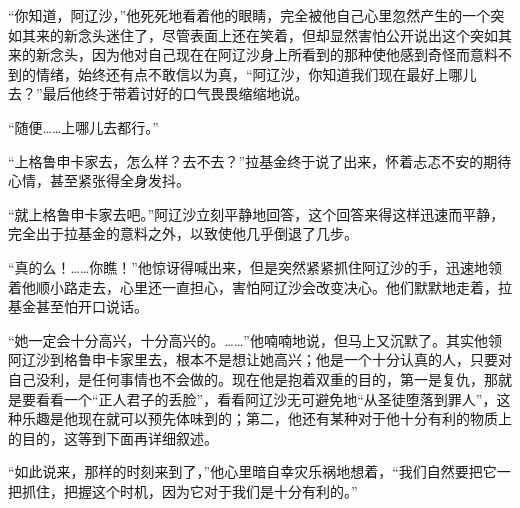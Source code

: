 \par “你知道，阿辽沙，”他死死地看着他的眼睛，完全被他自己心里忽然产生的一个突如其来的新念头迷住了，尽管表面上还在笑着，但却显然害怕公开说出这个突如其来的新念头，因为他对自己现在在阿辽沙身上所看到的那种使他感到奇怪而意料不到的情绪，始终还有点不敢信以为真，“阿辽沙，你知道我们现在最好上哪儿去？”最后他终于带着讨好的口气畏畏缩缩地说。
\par “随便……上哪儿去都行。”
\par “上格鲁申卡家去，怎么样？去不去？”拉基金终于说了出来，怀着忐忑不安的期待心情，甚至紧张得全身发抖。
\par “就上格鲁申卡家去吧。”阿辽沙立刻平静地回答，这个回答来得这样迅速而平静，完全出于拉基金的意料之外，以致使他几乎倒退了几步。
\par “真的么！……你瞧！”他惊讶得喊出来，但是突然紧紧抓住阿辽沙的手，迅速地领着他顺小路走去，心里还一直担心，害怕阿辽沙会改变决心。他们默默地走着，拉基金甚至怕开口说话。
\par “她一定会十分高兴，十分高兴的。……”他喃喃地说，但马上又沉默了。其实他领阿辽沙到格鲁申卡家里去，根本不是想让她高兴；他是一个十分认真的人，只要对自己没利，是任何事情也不会做的。现在他是抱着双重的目的，第一是复仇，那就是要看看一个“正人君子的丢脸”，看看阿辽沙无可避免地“从圣徒堕落到罪人”，这种乐趣是他现在就可以预先体味到的；第二，他还有某种对于他十分有利的物质上的目的，这等到下面再详细叙述。
\par “如此说来，那样的时刻来到了，”他心里暗自幸灾乐祸地想着，“我们自然要把它一把抓住，把握这个时机，因为它对于我们是十分有利的。”
